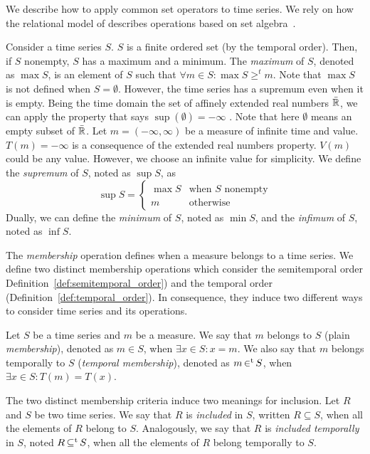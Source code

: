 We describe how to apply common set operators to time series. We rely
on how the relational model of  describes operations based
on set algebra~\cite{date:introduction}.

Consider a time series $S$. $S$ is a finite ordered set (by the
temporal order). Then, if $S$ nonempty, $S$ has a maximum and a
minimum.  The \emph{maximum} of $S$, denoted as $\max S$, is an
element of $S$ such that $\forall m \in S:\max S\geq^t m $.  Note that
$\max S$ is not defined when $S=\emptyset$. However, the time series
has a supremum even when it is empty.  Being the time domain the set
of affinely extended real numbers $\bar{\mathbb{R}}$, we can apply the property
that says $\sup(\emptyset)=-\infty$ \cite{cantrell:extendedreal}. Note
that here $\emptyset$ means an empty subset of $\bar{\mathbb{R}}$. Let
$m=(-\infty,\infty)$ be a measure of infinite time and
value. $T(m)=-\infty$ is a consequence of the extended real numbers
property.  $V(m)$ could be any value. However, we choose an infinite
value for simplicity. We define the \emph{supremum} of $S$, noted as
$\sup S$, as
\[
\sup S =\begin{cases}
  \max S    & \text{when $S$ nonempty}\\
  m   & \text{otherwise}
\end{cases}
\]
Dually, we can define the \emph{minimum} of $S$, noted as $\min S$,
and the \emph{infimum} of $S$, noted as $\inf S$.

The \emph{membership} operation defines when a measure belongs to a
time series. We define two distinct membership operations which
consider the semitemporal order
Definition~\ref{def:semitemporal_order}) and the temporal order
(Definition~\ref{def:temporal_order}). In consequence, they induce two
different ways to consider time series and its operations.

Let $S$ be a time series and $m$ be a measure. We say that $m$ belongs
to $S$ (plain \emph{membership}), denoted as $m \in S$, when $\exists
x\in S: x=m$.  We also say that $m$ belongs temporally to $S$
(\emph{temporal membership}), denoted as $m \operatorname*{\in^t} S$, when $\exists
x\in S : T(m)=T(x)$.

The two distinct membership criteria induce two meanings for
inclusion. Let $R$ and $S$ be two time series.  We say that $R$ is
\emph{included} in $S$, written $R\subseteq S$, when all the elements
of $R$ belong to $S$.  Analogously, we say that $R$ is \emph{included
  temporally} in $S$, noted $R\operatorname*{\subseteq^t} S$, when all the elements of
$R$ belong temporally to $S$.

